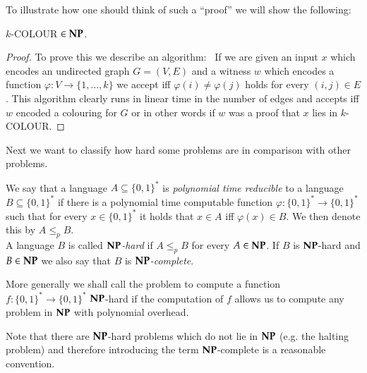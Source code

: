 To illustrate how one should think of such a ``proof''  we will show the following:

\begin{Proposition}
 $k$-COLOUR $\in \mathbf{NP}$.
\end{Proposition}

\begin{proof}
 To prove this we describe an algorithm: \
 If we are given an input $x$ which encodes an undirected graph $G = (V,E)$ and a witness $w$ which encodes a 
 function $\varphi \colon V \to \lbrace 1, \dotsc, k \rbrace$ we accept iff $\varphi(i) \neq \varphi(j)$ holds
 for every $(i,j) \in E$ .
 This algorithm clearly runs in linear time in the number of edges and accepts iff $w$ encoded a  colouring for $G$ or in other words if
 $w$ was a proof that $x$ lies in $k$-COLOUR.
\end{proof}

Next we want to classify how hard some problems are in comparison with other problems.

\begin{Definition}
 We say that a language $A \subseteq {\lbrace 0,1 \rbrace}^*$ is \emph{polynomial time reducible} to a language 
 $B \subseteq {\lbrace 0,1 \rbrace}^*$ if there is a polynomial time computable function 
 ${\varphi \colon {\lbrace 0,1 \rbrace}^* \to {\lbrace 0,1 \rbrace}^*}$ such that for every $x \in {\lbrace 0,1 \rbrace}^*$ 
 it holds that $x \in A$ iff $\varphi (x) \in B$. We then denote this by $ A \leq_p B$. \\
 A language $B$ is called \emph{$\mathbf{NP}$-hard} if $A \leq_p B$ for every $A \in \mathbf{NP}$. If $B$ is $\mathbf{NP}$-hard
 and $B \in \mathbf{NP}$ we also say that $B$ is \emph{$\mathbf{NP}$-complete}.
\end{Definition}

\begin{Remark}
 More generally we shall call the problem to compute a function $f \colon {\lbrace 0,1 \rbrace}^* \to {\lbrace 0,1 \rbrace}^*$
 $\mathbf{NP}$-hard if the computation of $f$ allows us to compute any problem in $\mathbf{NP}$ with polynomial overhead.
\end{Remark}

\begin{Remark}
 Note that there are $\mathbf{NP}$-hard problems which do not lie in $\mathbf{NP}$ (e.g. the halting problem)
 and therefore introducing the term $\mathbf{NP}$-complete is a reasonable convention.
\end{Remark}


